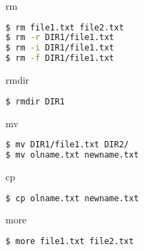 \documentclass{beamer}
\begin{document}
\begin{frame}[fragile]
 \begin{center}
    \huge{rm}\\
    \end{center}
\begin{lstlisting}[language=bash]
$ rm file1.txt file2.txt
$ rm -r DIR1/file1.txt
$ rm -i DIR1/file1.txt
$ rm -f DIR1/file1.txt
\end{lstlisting}
\end{frame}



\begin{frame}[fragile]
 \begin{center}
    \huge{rmdir}\\
    \end{center}
\begin{lstlisting}[language=bash]
$ rmdir DIR1
\end{lstlisting}
\end{frame}

\begin{frame}[fragile]
 \begin{center}
    \huge{mv}\\
    \end{center}
\begin{lstlisting}[language=bash]
$ mv DIR1/file1.txt DIR2/
$ mv olname.txt newname.txt
\end{lstlisting}
\end{frame}


\begin{frame}[fragile]
 \begin{center}
    \huge{cp}\\
    \end{center}
\begin{lstlisting}[language=bash]
$ cp olname.txt newname.txt
\end{lstlisting}
\end{frame}



\begin{frame}[fragile]
 \begin{center}
    \huge{more}\\
    \end{center}
\begin{lstlisting}[language=bash]
$ more file1.txt file2.txt
\end{lstlisting}
\end{frame}
\end{document}
